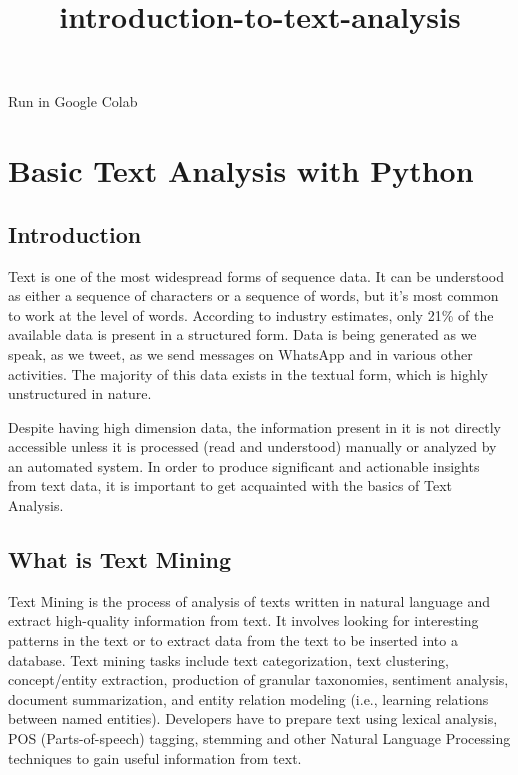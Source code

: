 \documentclass[11pt]{article}
\title{introduction-to-text-analysis}
\begin{document}
    
    \maketitle
    
    

    
    Run in Google Colab

    \hypertarget{basic-text-analysis-with-python}{%
\section{Basic Text Analysis with
Python}\label{basic-text-analysis-with-python}}

    \hypertarget{introduction}{%
\subsection{Introduction}\label{introduction}}

Text is one of the most widespread forms of sequence data. It can be
understood as either a sequence of characters or a sequence of words,
but it's most common to work at the level of words. According to
industry estimates, only 21\% of the available data is present in a
structured form. Data is being generated as we speak, as we tweet, as we
send messages on WhatsApp and in various other activities. The majority
of this data exists in the textual form, which is highly unstructured in
nature.

Despite having high dimension data, the information present in it is not
directly accessible unless it is processed (read and understood)
manually or analyzed by an automated system. In order to produce
significant and actionable insights from text data, it is important to
get acquainted with the basics of Text Analysis.

    \hypertarget{what-is-text-mining}{%
\subsection{What is Text Mining}\label{what-is-text-mining}}

    Text Mining is the process of analysis of texts written in natural
language and extract high-quality information from text. It involves
looking for interesting patterns in the text or to extract data from the
text to be inserted into a database. Text mining tasks include text
categorization, text clustering, concept/entity extraction, production
of granular taxonomies, sentiment analysis, document summarization, and
entity relation modeling (i.e., learning relations between named
entities). Developers have to prepare text using lexical analysis, POS
(Parts-of-speech) tagging, stemming and other Natural Language
Processing techniques to gain useful information from text.
\end{document}
